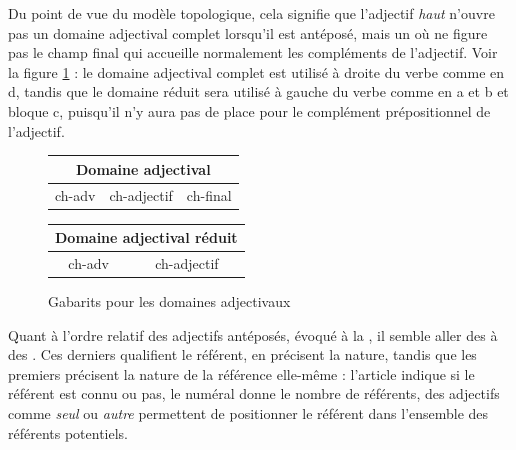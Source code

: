 {    \ea\label{ex:mur}
    \z
    \z
    
    Du point de vue du modèle topologique, cela signifie que l’adjectif \textit{haut} n’ouvre pas un domaine adjectival complet lorsqu’il est antéposé, mais un  où ne figure pas le champ final qui accueille normalement les compléments de l’adjectif. Voir la figure \ref{fig:domaine-adj} : le domaine adjectival complet est utilisé à droite du verbe comme en d, tandis que le domaine réduit sera utilisé à gauche du verbe comme en a et b et bloque c, puisqu'il n'y aura pas de place pour le complément prépositionnel de l'adjectif.

\begin{figure}[H]
    \caption{Gabarits pour les domaines adjectivaux}
    \label{fig:domaine-adj}
        \begin{center}
    \def\arraystretch{1.5}
    \setlength{\tabcolsep}{4ex}
    \begin{tabular}{|c|c|c|}
    \hline
    \multicolumn{3}{|c|}{\cellcolor{lsDOIGray}Domaine adjectival}\\\hline
    ch-adv & \cellcolor{lsDOIGray} ch-adjectif & ch-final\\
    \hline
    \end{tabular}
    \end{center}
   \begin{center}
    \def\arraystretch{1.5}
    \setlength{\tabcolsep}{4ex}
    \begin{tabular}{|c|c|}
    \hline
    \multicolumn{2}{|c|}{\cellcolor{lsDOIGray}Domaine adjectival réduit}\\\hline
    ch-adv & \cellcolor{lsDOIGray}ch-adjectif\\
    \hline
    \end{tabular}
    \end{center}
\end{figure}

    Quant à l’ordre relatif des adjectifs antéposés, évoqué à la , il semble aller des  à des . Ces derniers qualifient le référent, en précisent la nature, tandis que les premiers précisent la nature de la référence elle-même : l’article indique si le référent est connu ou pas, le numéral donne le nombre de référents, des adjectifs comme \textit{seul} ou \textit{autre} permettent de positionner le référent dans l’ensemble des référents potentiels.
}

